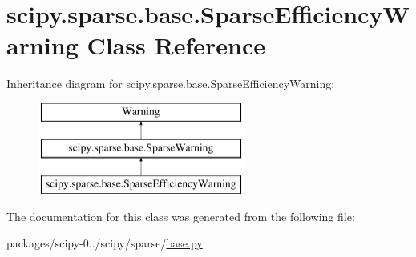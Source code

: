 \hypertarget{classscipy_1_1sparse_1_1base_1_1SparseEfficiencyWarning}{}\section{scipy.\+sparse.\+base.\+Sparse\+Efficiency\+Warning Class Reference}
\label{classscipy_1_1sparse_1_1base_1_1SparseEfficiencyWarning}
Inheritance diagram for scipy.\+sparse.\+base.\+Sparse\+Efficiency\+Warning\+:\begin{figure}[H]
\begin{center}
\leavevmode
\includegraphics[height=3.000000cm]{classscipy_1_1sparse_1_1base_1_1SparseEfficiencyWarning}
\end{center}
\end{figure}


The documentation for this class was generated from the following file\+:\begin{DoxyCompactItemize}
\item 
packages/scipy-\/0../scipy/sparse/\hyperlink{base_8py}{base.\+py}\end{DoxyCompactItemize}
